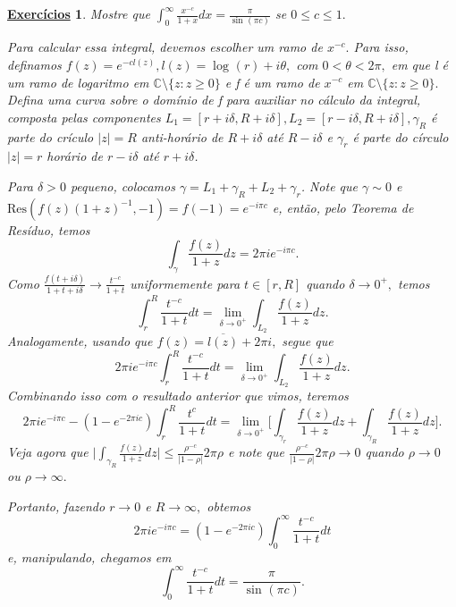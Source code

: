\documentclass{article}
\newtheorem*{exer*}{\underline{Exerc\'icios}}
\begin{document}
  \begin{exer*}
    Mostre que \(\int_{0}^{\infty}\frac{x^{-c}}{1+x}dx = \frac{\pi }{\sin^{}{(\pi c)}}\) se \(0 \leq c\leq 1.\)

    Para calcular essa integral, devemos escolher um ramo de \(x^{-c}.\) Para isso, definamos \(f(z) = e^{-c l(z)}, l(z) = \log^{}{(r)} + i\theta ,\) com 
  \(0 < \theta <2\pi ,\) em que l é um ramo de logaritmo em \(\mathbb{C}\setminus{\{z: z\geq 0\}}\) e f é um ramo de \(x^{-c}\) em \(\mathbb{C}\setminus{\{z: z \geq 0\}}.\)
  Defina uma curva sobre o domínio de f para auxiliar no cálculo da integral, composta pelas componentes \(L_{1} = [r+i\delta , R+i\delta ], L_{2} = [r-i\delta , R+i\delta ],\gamma_{R}\) 
  é parte do crículo \(|z| = R\) anti-horário de \(R+i\delta \) até \(R-i\delta \) e \(\gamma_{r}\) é parte do círculo \(|z| = r\) horário de \(r-i\delta \) até \(r+i\delta \). 

  Para \(\delta > 0\) pequeno, colocamos \(\gamma  = L_{1} + \gamma _{R} + L_{2} + \gamma_{r}\). Note que \(\gamma \sim 0\) e \(\mathrm{Res}(f(z)(1+z)^{-1}, -1) = f(-1) = e^{-i\pi c}\) e, então, pelo Teorema de
  Resíduo, temos 
    \[
      \int_{\gamma }^{}\frac{f(z)}{1+z}dz = 2\pi i e^{-i\pi c}.
    \]
    Como \(\frac{f(t+i\delta )}{1+t+i\delta }\to \frac{t^{-c}}{1+t}\) uniformemente para \(t\in[r, R]\) quando \(\delta \to 0^{+},\) temos 
      \[
        \int_{r}^{R}\frac{t^{-c}}{1+t}dt = \lim_{\delta \to 0^{+}}\int_{L_{2}}^{}\frac{f(z)}{1+z}dz.
      \]
    Analogamente, usando que \(f(z) = \overline{l(z)}+2\pi i,\) segue que 
      \[
        2\pi ie^{-i\pi c}\int_{r}^{R}\frac{t^{-c}}{1+t}dt = \lim_{\delta \to 0^{+}} \int_{L_{2}}^{}\frac{f(z)}{1+z}dz.
      \]
    Combinando isso com o resultado anterior que vimos, teremos 
      \[
        2\pi i e^{-i\pi c} - (1 - e^{-2\pi ic})\int_{r}^{R}\frac{t^{c}}{1+t}dt = \lim_{\delta \to 0^{+}}\biggl[\int_{\gamma_{r}}^{}\frac{f(z)}{1+z}dz + \int_{\gamma_R}^{}\frac{f(z)}{1+z}dz\biggr].
      \]
  Veja agora que \(\biggl\vert \int_{\gamma_{R}}^{}\frac{f(z)}{1+z}dz \biggr\vert \leq \frac{\rho ^{-c}}{|1-\rho |}2\pi \rho \) e note que \(\frac{\rho^{-c} }{|1-\rho |}2\pi \rho \to 0\) quando \(\rho \to 0\) ou \(\rho \to \infty.\)

  Portanto, fazendo \(r\to0\) e \(R\to\infty,\) obtemos 
    \[
      2\pi i e^{-i\pi c} = (1-e^{-2\pi ic})\int_{0}^{\infty}\frac{t^{-c}}{1+t}dt
    \]
  e, manipulando, chegamos em 
  \[
    \int_{0}^{\infty}\frac{t^{-c}}{1+t}dt = \frac{\pi }{\sin^{}{(\pi c)}}.
  \]
  \end{exer*}
  \newpage
\end{document}
